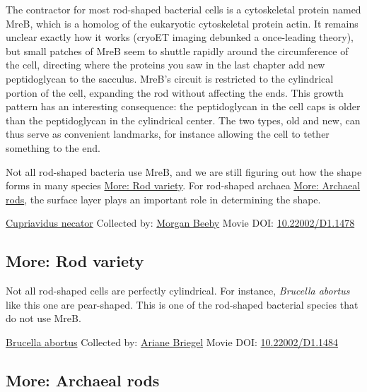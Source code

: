 \documentclass[]{tufte-book}
\begin{document}
The contractor for most rod-shaped bacterial cells is a cytoskeletal protein named MreB, which is a homolog of the eukaryotic cytoskeletal protein actin. It remains unclear exactly how it works (cryoET imaging debunked a once-leading theory), but small patches of MreB seem to shuttle rapidly around the circumference of the cell, directing where the proteins you saw in the last chapter add new peptidoglycan to the sacculus. MreB's circuit is restricted to the cylindrical portion of the cell, expanding the rod without affecting the ends. This growth pattern has an interesting consequence: the peptidoglycan in the cell caps is older than the peptidoglycan in the cylindrical center. The two types, old and new, can thus serve as convenient landmarks, for instance allowing the cell to tether something to the end.

Not all rod-shaped bacteria use MreB, and we are still figuring out how the shape forms in many species \protect\hyperlink{Rod_variety}{More: Rod variety}. For rod-shaped archaea \protect\hyperlink{Archaeal_rods}{More: Archaeal rods}, the surface layer plays an important role in determining the shape.



\hypertarget{htmlwidget-b84b2e75e319401d319c}{}

\label{fig:3-2}\protect\hyperlink{tree}{Cupriavidus necator} Collected by: \protect\hyperlink{morgan_beeby}{Morgan Beeby} Movie DOI: \href{https://doi.org/10.22002/D1.1478}{10.22002/D1.1478}

\hypertarget{Rod_variety}{%
\subsection*{More: Rod variety}\label{Rod_variety}}

Not all rod-shaped cells are perfectly cylindrical. For instance, \emph{Brucella abortus} like this one are pear-shaped. This is one of the rod-shaped bacterial species that do not use MreB.



\hypertarget{htmlwidget-b85075cf42be59ee1882}{}

\label{fig:3-2a}\protect\hyperlink{tree}{Brucella abortus} Collected by: \protect\hyperlink{ariane_briegel}{Ariane Briegel} Movie DOI: \href{https://doi.org/10.22002/D1.1484}{10.22002/D1.1484}

\hypertarget{Archaeal_rods}{%
\subsection*{More: Archaeal rods}\label{Archaeal_rods}}
\end{document}
